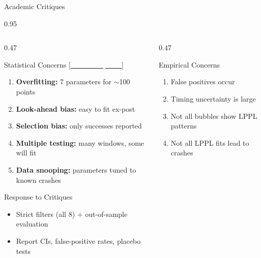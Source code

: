 \documentclass[9pt, aspectratio=169, t]{beamer}
\begin{document}
\begin{frame}{Academic Critiques}
    \begin{cminipage}{0.95\textwidth}
    {\scriptsize
    \begin{columns}[T]
        \begin{column}{0.47\textwidth}
            \begin{alertblock}{Statistical Concerns {\scriptsize[\href{https://doi.org/10.1080/14697688.2011.607467}{\textcolor{white}{Bree et al., 2013}}]}}
                \begin{enumerate}\setlength{\itemsep}{0pt}
                    \item \textbf{Overfitting:} 7 parameters for $\sim$100 points
                    \item \textbf{Look-ahead bias:} easy to fit ex-post
                    \item \textbf{Selection bias:} only successes reported
                    \item \textbf{Multiple testing:} many windows, some will fit
                    \item \textbf{Data snooping:} parameters tuned to known crashes
                \end{enumerate}
            \end{alertblock}
            \vspace{-2mm}
            \begin{block}{Response to Critiques}
                \begin{itemize}\setlength{\itemsep}{0pt}
                    \item Strict filters (all 8) + out-of-sample evaluation
                    \item Report CIs, false-positive rates, placebo tests
                \end{itemize}
            \end{block}
        \end{column}
        \begin{column}{0.47\textwidth}
            \begin{alertblock}{Empirical Concerns}
                \begin{enumerate}\setlength{\itemsep}{0pt}
                    \item False positives occur
                    \item Timing uncertainty is large
                    \item Not all bubbles show LPPL patterns
                    \item Not all LPPL fits lead to crashes

\end{enumerate}
\end{alertblock}
\end{column}
\end{columns}}
\end{cminipage}
\end{frame}
\end{document}
